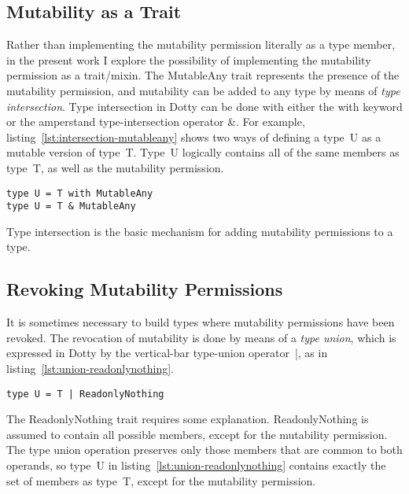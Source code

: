 \subsection{Mutability as a Trait}

Rather than implementing the mutability permission literally as a type member, in the present work I explore the possibility of implementing the mutability permission as a trait/mixin.
The {\cd MutableAny} trait represents the presence of the mutability permission, and mutability can be added to any type by means of {\em type intersection}. Type intersection in Dotty can be done with either the {\cd with} keyword or the amperstand type-intersection operator {\cd \&}.
For example, listing~\ref{lst:intersection-mutableany} shows two ways of defining a type~{\cd U} as a mutable version of type~{\cd T}.
Type~{\cd U} logically contains all of the same members as type~{\cd T}, as well as the mutability permission.

\begin{lstlisting}[float=htbp, caption={Intersection with MutableAny}, label={lst:intersection-mutableany}]
type U = T with MutableAny
type U = T & MutableAny
\end{lstlisting}

Type intersection is the basic mechanism for adding mutability permissions to a type.

\subsection{Revoking Mutability Permissions}

It is sometimes necessary to build types where mutability permissions have been revoked.
The revocation of mutability is done by means of a {\em type union}, which is expressed in Dotty by the vertical-bar type-union operator~{\cd |}, as in listing~\ref{lst:union-readonlynothing}.

\begin{lstlisting}[float=htbp, caption={Union with ReadonlyNothing}, label={lst:union-readonlynothing}]
type U = T | ReadonlyNothing
\end{lstlisting}

The {\cd ReadonlyNothing} trait requires some explanation. {\cd ReadonlyNothing} is assumed to contain all possible members, except for the mutability permission. The type union operation preserves only those members that are common to both operands, so type~{\cd U} in listing~\ref{lst:union-readonlynothing} contains exactly the set of members as type~{\cd T}, except for the mutability permission.

